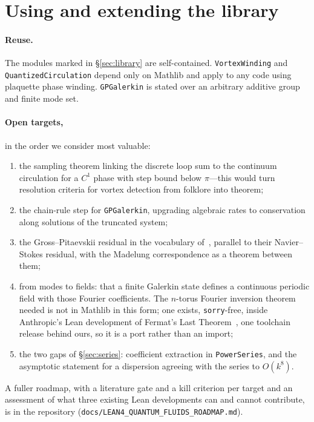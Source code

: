 \documentclass[11pt,a4paper]{article}
\theoremstyle{definition}
\newcommand{\lean}[1]{\texttt{\small #1}}
\begin{document}
\section{Using and extending the library}

\paragraph{Reuse.} The modules marked in \S\ref{sec:library} are self-contained.
\lean{VortexWinding} and \lean{QuantizedCirculation} depend only on Mathlib and apply to any
code using plaquette phase winding. \lean{GPGalerkin} is stated over an arbitrary additive
group and finite mode set.

\paragraph{Open targets,} in the order we consider most valuable:
\begin{enumerate}[leftmargin=*,itemsep=2pt]
\item the sampling theorem linking the discrete loop sum to the continuum circulation for a
  $C^1$ phase with step bound below $\pi$---this would turn resolution criteria for vortex
  detection from folklore into theorem;
\item the chain-rule step for \lean{GPGalerkin}, upgrading algebraic rates to conservation
  along solutions of the truncated system;
\item the Gross--Pitaevskii residual in the vocabulary of~\cite{OpenAINSE}, parallel to their
  Navier--Stokes residual, with the Madelung correspondence as a theorem between them;
\item from modes to fields: that a finite Galerkin state defines a continuous periodic field with
  those Fourier coefficients. The $n$-torus Fourier inversion theorem needed is not in Mathlib in this
  form; one exists, \lean{sorry}-free, inside Anthropic's Lean development of Fermat's Last
  Theorem~\cite{AnthropicFLT}, one toolchain release behind ours, so it is a port rather than an import;
\item the two gaps of \S\ref{sec:series}: coefficient extraction in \lean{PowerSeries}, and the
  asymptotic statement for a dispersion agreeing with the series to $O(k^8)$.
\end{enumerate}

\noindent A fuller roadmap, with a literature gate and a kill criterion per target and an assessment of
what three existing Lean developments can and cannot contribute, is in the repository
(\texttt{docs/LEAN4\_QUANTUM\_FLUIDS\_ROADMAP.md}).
\end{document}
